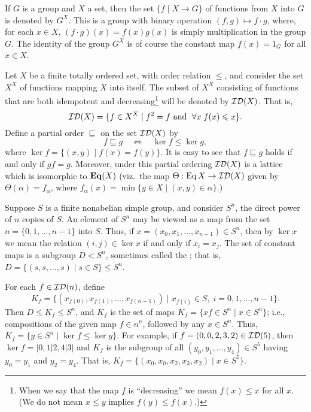 If $G$ is a group and $X$ a set, then the set $\{f \mid X\rightarrow G\}$ of 
functions from $X$ into $G$ is denoted by $G^X$.  This is a group with binary
operation $(f,g) \mapsto f\cdot g$, where,  
for each $x\in X$, $(f\cdot g)(x)= f(x)g(x)$ is simply multiplication
in the group $G$.  The identity of the group $G^X$ is of course the constant map $f(x) =
1_G$ for all $x\in X$.

Let $X$ be a finite totally ordered set, with order relation $\leq$,
and consider the set $X^X$ of functions mapping $X$ into itself.  
The subset of $X^X$ consisting of functions that are both idempotent and
decreasing\footnote{When we say that the map $f$ is ``decreasing'' we mean
  $f(x)\leq x$ for all $x$. (We do not mean $x\leq y$ implies $f(y) \leq f(x)$.)}
will be denoted by $\mathcal{ID}(X)$.  That is,
\[
\mathcal{ID}(X) = \{f\in X^X \mid f^2 = f \text{ and }\; \forall x\; f(x) \leqslant x\}.
\]
Define a partial order $\sqsubseteq$ on the set $\mathcal{ID}(X)$ by
\begin{equation}
  \label{eq:MID111}
  f\sqsubseteq g \quad \Leftrightarrow \quad \ker f \leq \ker g,
\end{equation}
where $\ker f = \{(x,y) \mid f(x) = f(y)\}$.
It is easy to see that $f\sqsubseteq g$ holds if and only if $gf = g$.  
Moreover, under this partial ordering $\mathcal{ID}(X)$ is a lattice which is 
isomorphic to $\mathbf{Eq}(X)$ (viz.~the map $\Theta : \operatorname{Eq} X \rightarrow
\mathcal{ID}(X)$ given by $\Theta(\alpha) = f_\alpha$, where
$f_\alpha(x) = \min\{y\in X \mid (x,y)\in \alpha\}$.) %


Suppose $S$ is a finite nonabelian simple
group, and consider $S^n$, the direct power of $n$ copies of $S$.
An element of $S^n$ may be viewed as a map from the set 
$n = \{0, 1, \dots, n-1\}$ into $S$.  Thus, if 
$x = (x_0, x_1, \dots, x_{n-1})\in S^n$, then by 
$\ker x$ we mean the relation $(i,j) \in \ker x$ if and only if $x_i = x_j$.
The set of constant maps is a subgroup $D < S^n$, sometimes called the
; that is,
$D = \{(s, s, \dots, s) \mid s\in S\} \leq S^n$.

For each $f \in \mathcal{ID}(n)$, define
\[
K_f = \{(x_{f(0)}, x_{f(1)}, \dots, x_{f(n-1)}) \mid x_{f(i)}\in S, \; i = 0, 1,
\dots, n-1\}.
\]
Then $D \leq K_f\leq S^n$, and $K_f$ is the set of maps
$K_f = \{x f \in S^n \mid x \in S^n \}$; i.e., compositions of the given
map $f\in n^n$, followed by  any $x\in S^n$.  Thus, 
$K_f = \{ y\in S^n \mid \ker f \leq \ker y \}$.
For example, 
if $f = (0, 0, 2, 3, 2)\in \mathcal{ID}(5)$, then 
$\ker f = |0,1|2,4|3|$ and 
$K_f$ is the subgroup %
of all $(y_0, y_1, \dots, y_4)\in S^5$ having $y_0 = y_1$ and $y_2 = y_4$. That is,
$K_f = \{(x_{0}, x_{0}, x_2, x_3, x_2) \mid x\in S^5\}$.


